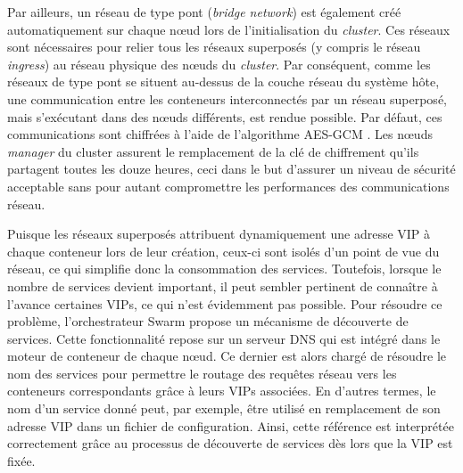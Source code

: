 Par ailleurs, un réseau de type pont (\textit{bridge network}) est également créé automatiquement sur chaque n\oe{}ud lors de l'initialisation du \textit{cluster}. Ces réseaux sont nécessaires pour relier tous les réseaux superposés (y compris le réseau \textit{ingress}) au réseau physique des n\oe{}uds du \textit{cluster}. Par conséquent, comme les réseaux de type pont se situent au-dessus de la couche réseau du système hôte, une communication entre les conteneurs interconnectés par un réseau superposé, mais s'exécutant dans des n\oe{}uds différents, est rendue possible. Par défaut, ces communications sont chiffrées à l'aide de l'algorithme AES-GCM \citep{rfc5288}. Les n\oe{}uds \textit{manager} du cluster assurent le remplacement de la clé de chiffrement qu'ils partagent toutes les douze heures, ceci dans le but d'assurer un niveau de sécurité acceptable sans pour autant compromettre les performances des communications réseau.

Puisque les réseaux superposés attribuent dynamiquement une adresse \acl{VIP} à chaque conteneur lors de leur création, ceux-ci sont isolés d'un point de vue du réseau, ce qui simplifie donc la consommation des services. Toutefois, lorsque le nombre de services devient important, il peut sembler pertinent de connaître à l'avance certaines \acsp{VIP}, ce qui n'est évidemment pas possible. Pour résoudre ce problème, l'orchestrateur Swarm propose un mécanisme de découverte de services. Cette fonctionnalité repose sur un serveur DNS qui est intégré dans le moteur de conteneur de chaque n\oe{}ud. Ce dernier est alors chargé de résoudre le nom des services pour permettre le routage des requêtes réseau vers les conteneurs correspondants grâce à leurs \acsp{VIP} associées. En d'autres termes, le nom d'un service donné peut, par exemple, être utilisé en remplacement de son adresse \acl{VIP} dans un fichier de configuration. Ainsi, cette référence est interprétée correctement grâce au processus de découverte de services dès lors que la \acs{VIP} est fixée.


